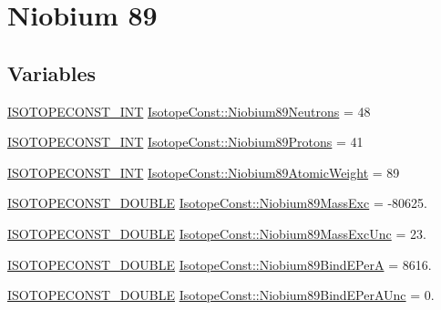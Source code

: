 \hypertarget{group___isotope_const-_niobium-_nb89}{}\section{Niobium 89}
\label{group___isotope_const-_niobium-_nb89}
\subsection*{Variables}
\begin{DoxyCompactItemize}
\item 
\mbox{\hyperlink{group___isotope_const-_macros_ga5f18360b3e99483a35c32d789e62621c}{I\+S\+O\+T\+O\+P\+E\+C\+O\+N\+S\+T\+\_\+\+I\+NT}} \mbox{\hyperlink{group___isotope_const-_niobium-_nb89_ga1433e1299df4a247e7d8c7aec87c7939}{Isotope\+Const\+::\+Niobium89\+Neutrons}} = 48
\item 
\mbox{\hyperlink{group___isotope_const-_macros_ga5f18360b3e99483a35c32d789e62621c}{I\+S\+O\+T\+O\+P\+E\+C\+O\+N\+S\+T\+\_\+\+I\+NT}} \mbox{\hyperlink{group___isotope_const-_niobium-_nb89_gaee4fa503a8ae88ec52cb931d30a77fe1}{Isotope\+Const\+::\+Niobium89\+Protons}} = 41
\item 
\mbox{\hyperlink{group___isotope_const-_macros_ga5f18360b3e99483a35c32d789e62621c}{I\+S\+O\+T\+O\+P\+E\+C\+O\+N\+S\+T\+\_\+\+I\+NT}} \mbox{\hyperlink{group___isotope_const-_niobium-_nb89_ga40da4641017d83974969124e03d09450}{Isotope\+Const\+::\+Niobium89\+Atomic\+Weight}} = 89
\item 
\mbox{\hyperlink{group___isotope_const-_macros_ga8f45a7272ce02c0b4c65c44636ed719a}{I\+S\+O\+T\+O\+P\+E\+C\+O\+N\+S\+T\+\_\+\+D\+O\+U\+B\+LE}} \mbox{\hyperlink{group___isotope_const-_niobium-_nb89_ga158dfd02df3d941cd405e7bb4d2d820f}{Isotope\+Const\+::\+Niobium89\+Mass\+Exc}} = -\/80625.
\item 
\mbox{\hyperlink{group___isotope_const-_macros_ga8f45a7272ce02c0b4c65c44636ed719a}{I\+S\+O\+T\+O\+P\+E\+C\+O\+N\+S\+T\+\_\+\+D\+O\+U\+B\+LE}} \mbox{\hyperlink{group___isotope_const-_niobium-_nb89_ga6b990b7b34a89d8ebe2e2313716e3b0d}{Isotope\+Const\+::\+Niobium89\+Mass\+Exc\+Unc}} = 23.
\item 
\mbox{\hyperlink{group___isotope_const-_macros_ga8f45a7272ce02c0b4c65c44636ed719a}{I\+S\+O\+T\+O\+P\+E\+C\+O\+N\+S\+T\+\_\+\+D\+O\+U\+B\+LE}} \mbox{\hyperlink{group___isotope_const-_niobium-_nb89_gad890d77f399f98fdcb62252244e6446d}{Isotope\+Const\+::\+Niobium89\+Bind\+E\+PerA}} = 8616.
\item 
\mbox{\hyperlink{group___isotope_const-_macros_ga8f45a7272ce02c0b4c65c44636ed719a}{I\+S\+O\+T\+O\+P\+E\+C\+O\+N\+S\+T\+\_\+\+D\+O\+U\+B\+LE}} \mbox{\hyperlink{group___isotope_const-_niobium-_nb89_ga6f17f8f4389ba2fa4a35700eac325a3d}{Isotope\+Const\+::\+Niobium89\+Bind\+E\+Per\+A\+Unc}} = 0.

\end{DoxyCompactItemize}
